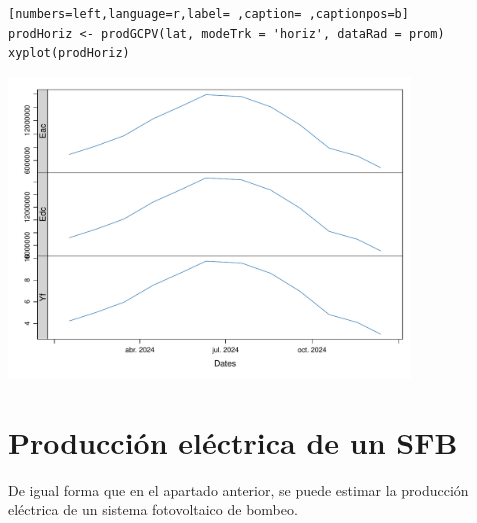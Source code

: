 \begin{lstlisting}[numbers=left,language=r,label= ,caption= ,captionpos=b]
prodHoriz <- prodGCPV(lat, modeTrk = 'horiz', dataRad = prom)
xyplot(prodHoriz)
\end{lstlisting}

\begin{center}
\includegraphics[width=0.8\textwidth]{figuras/codigo-prodgcpv.pdf}
\end{center}

\section{Producción eléctrica de un SFB}
\label{sec:orgfe4c545}
De igual forma que en el apartado anterior, se puede estimar la producción eléctrica de un sistema fotovoltaico de bombeo.

